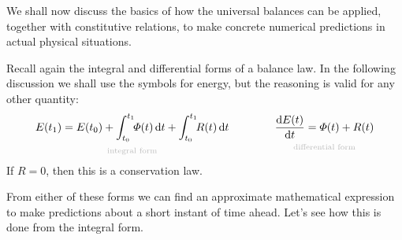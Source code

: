 \documentclass[a4paper,12pt,%
onecolumn,oneside,%
british%
]{memoir}
\newcommand*{\di}{\mathrm{d}}%
\renewcommand*{\|}[1][]{\nonscript\:#1\vert\nonscript\:\mathopen{}}
\newcommand*{\yti}{t_{0}}
\newcommand*{\ytf}{t_{1}}
\newcommand*{\yE}{E}
\newcommand*{\yH}{\varPhi}%
\newcommand*{\yR}{R}%
\begin{document}
We shall now discuss the basics of how the universal balances can be applied, together with constitutive relations, to make concrete numerical predictions in actual physical situations.

\medskip


Recall again the integral and differential forms of a balance law. In the following discussion we shall use the symbols for energy, but the reasoning is valid for any other quantity:
\begin{equation*}
      \underbracket[0pt]{\yE(\ytf) = \yE(\yti) + \int_{\yti}^{\ytf}\!\!\yH(t)\,\di t + \int_{\yti}^{\ytf}\!\!\yR(t)\,\di t}_{\mathclap{\text{\color{grey}integral form}}}
      \qquad%
      \qquad
      \underbracket[0pt]{\frac{\di\yE(t)}{\di t} = \yH(t) + \yR(t)}_{\mathclap{\text{\color{grey}differential form}}}
\end{equation*}
If $\yR=0$, then this is a conservation law.

From either of these forms we can find an approximate mathematical expression to make predictions about a short instant of time ahead. Let's see how this is done from the integral form.
\end{document}
